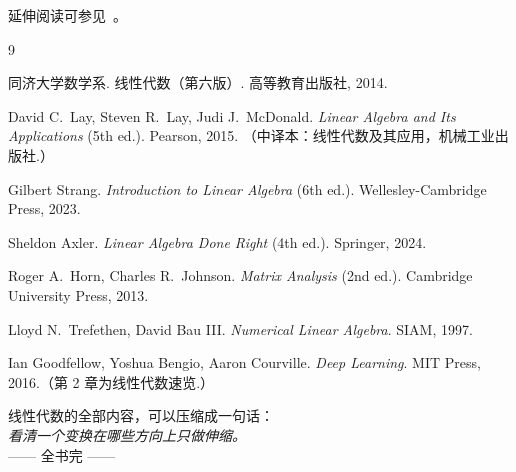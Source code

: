 \documentclass[11pt,a4paper,openany]{ctexbook}
\newcommand{\cjkkai}{\CJKfamily{kai}}
\begin{document}
\par\noindent 延伸阅读可参见~\cite{tongji,lay,strang}。\par
\begin{thebibliography}{9}
\small
{}

同济大学数学系. 线性代数（第六版）. 高等教育出版社, 2014.

David C.\ Lay, Steven R.\ Lay, Judi J.\ McDonald.
\emph{Linear Algebra and Its Applications} (5th ed.). Pearson, 2015.
（中译本：线性代数及其应用，机械工业出版社.）

Gilbert Strang. \emph{Introduction to Linear Algebra} (6th ed.).
Wellesley-Cambridge Press, 2023.

Sheldon Axler. \emph{Linear Algebra Done Right} (4th ed.). Springer, 2024.

Roger A.\ Horn, Charles R.\ Johnson.
\emph{Matrix Analysis} (2nd ed.). Cambridge University Press, 2013.

Lloyd N.\ Trefethen, David Bau III.
\emph{Numerical Linear Algebra}. SIAM, 1997.

Ian Goodfellow, Yoshua Bengio, Aaron Courville.
\emph{Deep Learning}. MIT Press, 2016.（第 2 章为线性代数速览.）

\end{thebibliography}

\vspace{0.6cm}
\begin{flushright}
\cjkkai
线性代数的全部内容，可以压缩成一句话：\\
\emph{看清一个变换在哪些方向上只做伸缩。}\\[4pt]
{\sffamily\footnotesize\color{inkl}—— 全书完 ——}
\end{flushright}
\end{document}
